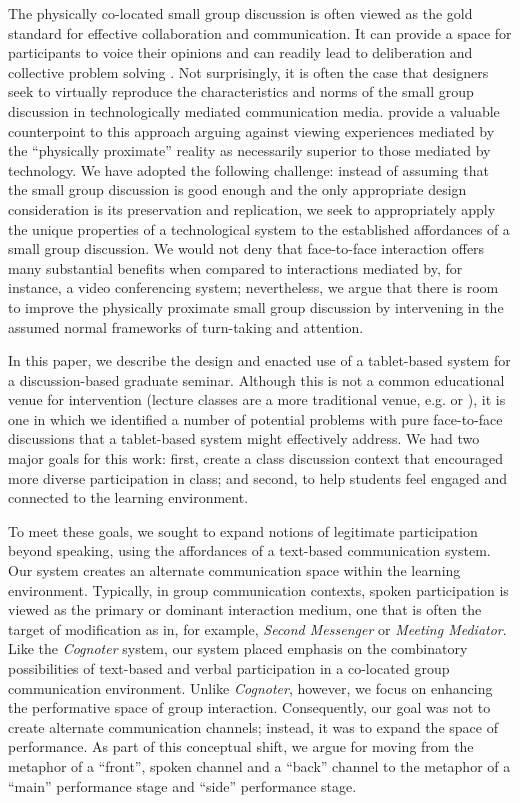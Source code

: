 The physically co-located small group discussion is often viewed as the gold standard for effective collaboration and communication.  It can provide a space for participants to voice their opinions and can readily lead to deliberation and collective problem solving \citep{Burkhalter:2002vg}. Not surprisingly, it is often the case that designers seek to virtually reproduce the characteristics and norms of the small group discussion in technologically mediated communication media. \citet{Hollan:1992tz} provide a valuable counterpoint to this approach arguing against viewing experiences mediated by the ``physically proximate'' reality as necessarily superior to those mediated by technology. We have adopted the following challenge: instead of assuming that the small group discussion is good enough and the only appropriate design consideration is its preservation and replication, we seek to appropriately apply the unique properties of a technological system to the established affordances of a small group discussion. We would not deny that face-to-face interaction offers many substantial benefits when compared to interactions mediated by, for instance, a video conferencing system; nevertheless, we argue that there is room to improve the physically proximate small group discussion by intervening in the assumed normal frameworks of turn-taking and attention.

In this paper, we describe the design and enacted use of a tablet-based system for a discussion-based graduate seminar. Although this is not a common educational venue for intervention (lecture classes are a more traditional venue, e.g. \citep{Kam:2005wb} or \citep{Bergstrom:wl}), it is one in which we identified a number of potential problems with pure face-to-face discussions that a tablet-based system might effectively address. We had two major goals for this work: first, create a class discussion context that encouraged more diverse participation in class; and second, to help students feel engaged and connected to the learning environment. 

To meet these goals, we sought to expand notions of legitimate participation beyond speaking, using the affordances of a text-based communication system. Our system creates an alternate communication space within the learning environment. Typically, in group communication contexts, spoken participation is viewed as the primary or dominant interaction medium, one that is often the target of modification as in, for example, \emph{Second Messenger}\citep{DiMicco:2007ie} or \emph{Meeting Mediator}\citep{Kim:2008ip}. Like the \emph{Cognoter}\citep{Tatar:1991jq} system, our system placed emphasis on the combinatory possibilities of text-based and verbal participation in a co-located group communication environment.  Unlike \emph{Cognoter}, however, we focus on enhancing the performative space of group interaction. Consequently, our goal was not to create alternate communication channels; instead, it was to expand the space of performance. As part of this conceptual shift, we argue for moving from the metaphor of a ``front'', spoken channel and a ``back'' channel to the metaphor of a ``main'' performance stage and ``side'' performance stage.

